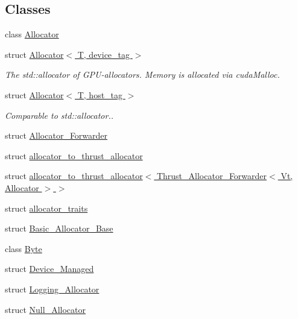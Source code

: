 \subsection*{Classes}
\begin{DoxyCompactItemize}
\item 
class \hyperlink{classbc_1_1allocators_1_1Allocator}{Allocator}
\item 
struct \hyperlink{structbc_1_1allocators_1_1Allocator_3_01T_00_01device__tag_01_4}{Allocator$<$ T, device\+\_\+tag $>$}
\begin{DoxyCompactList}\small\item\em The \textquotesingle{}std\+::allocator\textquotesingle{} of G\+P\+U-\/allocators. Memory is allocated via \textquotesingle{}cuda\+Malloc\textquotesingle{}. \end{DoxyCompactList}\item 
struct \hyperlink{structbc_1_1allocators_1_1Allocator_3_01T_00_01host__tag_01_4}{Allocator$<$ T, host\+\_\+tag $>$}
\begin{DoxyCompactList}\small\item\em Comparable to \textquotesingle{}std\+::allocator.\textquotesingle{}. \end{DoxyCompactList}\item 
struct \hyperlink{structbc_1_1allocators_1_1Allocator__Forwarder}{Allocator\+\_\+\+Forwarder}
\item 
struct \hyperlink{structbc_1_1allocators_1_1allocator__to__thrust__allocator}{allocator\+\_\+to\+\_\+thrust\+\_\+allocator}
\item 
struct \hyperlink{structbc_1_1allocators_1_1allocator__to__thrust__allocator_3_01Thrust__Allocator__Forwarder_3_01Vt_00_01Allocator_01_4_01_4}{allocator\+\_\+to\+\_\+thrust\+\_\+allocator$<$ Thrust\+\_\+\+Allocator\+\_\+\+Forwarder$<$ Vt, Allocator $>$ $>$}
\item 
struct \hyperlink{structbc_1_1allocators_1_1allocator__traits}{allocator\+\_\+traits}
\item 
struct \hyperlink{structbc_1_1allocators_1_1Basic__Allocator__Base}{Basic\+\_\+\+Allocator\+\_\+\+Base}
\item 
class \hyperlink{classbc_1_1allocators_1_1Byte}{Byte}
\item 
struct \hyperlink{structbc_1_1allocators_1_1Device__Managed}{Device\+\_\+\+Managed}
\item 
struct \hyperlink{structbc_1_1allocators_1_1Logging__Allocator}{Logging\+\_\+\+Allocator}
\item 
struct \hyperlink{structbc_1_1allocators_1_1Null__Allocator}{Null\+\_\+\+Allocator}

\end{DoxyCompactItemize}
